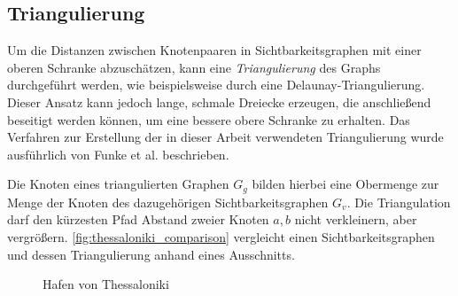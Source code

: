 \subsection{Triangulierung}

Um die Distanzen zwischen Knotenpaaren in Sichtbarkeitsgraphen mit einer oberen Schranke abzuschätzen, kann eine \emph{Triangulierung} des Graphs durchgeführt werden, wie beispielsweise durch eine Delaunay-Triangulierung.
Dieser Ansatz kann jedoch lange, schmale Dreiecke erzeugen, die anschließend beseitigt werden können, um eine bessere obere Schranke zu erhalten.
Das Verfahren zur Erstellung der in dieser Arbeit verwendeten Triangulierung wurde ausführlich von Funke et al. \cite{funkescalable} beschrieben.

Die Knoten eines triangulierten Graphen $G_g$ bilden hierbei eine Obermenge zur Menge der Knoten des dazugehörigen Sichtbarkeitsgraphen $G_v$.
Die Triangulation darf den kürzesten Pfad Abstand zweier Knoten $a, b$ nicht verkleinern, aber vergrößern.
\autoref{fig:thessaloniki_comparison} vergleicht einen Sichtbarkeitsgraphen und dessen Triangulierung anhand eines Ausschnitts.

\begin{figure}[h!]%
  \centering
  \caption{Hafen von Thessaloniki}%
  \label{fig:thessaloniki_comparison}%
\end{figure}

